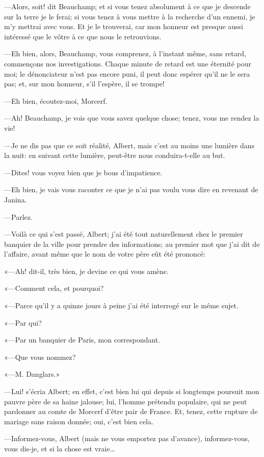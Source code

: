 —Alors, soit! dit Beauchamp; et si vous tenez absolument à ce que je descende sur la terre je le ferai; si vous tenez à vous mettre à la recherche d'un ennemi, je m'y mettrai avec vous. Et je le trouverai, car mon honneur est presque aussi intéressé que le vôtre à ce que nous le retrouvions. 

—Eh bien, alors, Beauchamp, vous comprenez, à l'instant même, sans retard, commençons nos investigations. Chaque minute de retard est une éternité pour moi; le dénonciateur n'est pas encore puni, il peut donc espérer qu'il ne le sera pas; et, sur mon honneur, s'il l'espère, il se trompe! 

—Eh bien, écoutez-moi, Morcerf. 

—Ah! Beauchamp, je vois que vous savez quelque chose; tenez, vous me rendez la vie! 

—Je ne dis pas que ce soit réalité, Albert, mais c'est au moins une lumière dans la nuit: en suivant cette lumière, peut-être nous conduira-t-elle au but. 

—Dites! vous voyez bien que je bous d'impatience. 

—Eh bien, je vais vous raconter ce que je n'ai pas voulu vous dire en revenant de Janina. 

—Parlez. 

—Voilà ce qui s'est passé, Albert; j'ai été tout naturellement chez le premier banquier de la ville pour prendre des informations; au premier mot que j'ai dit de l'affaire, avant même que le nom de votre père eût été prononcé: 

«—Ah! dit-il, très bien, je devine ce qui vous amène. 

«—Comment cela, et pourquoi? 

«—Parce qu'il y a quinze jours à peine j'ai été interrogé sur le même sujet. 

«—Par qui? 

«—Par un banquier de Paris, mon correspondant. 

«—Que vous nommez? 

«—M. Danglars.» 

—Lui! s'écria Albert; en effet, c'est bien lui qui depuis si longtemps poursuit mon pauvre père de sa haine jalouse; lui, l'homme prétendu populaire, qui ne peut pardonner au comte de Morcerf d'être pair de France. Et, tenez, cette rupture de mariage sans raison donnée; oui, c'est bien cela. 

—Informez-vous, Albert (mais ne vous emportez pas d'avance), informez-vous, vous dis-je, et si la chose est vraie\dots 

